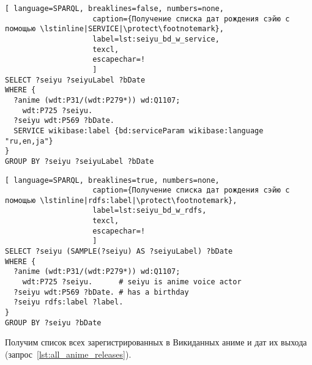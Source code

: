 %
\begin{lstlisting}[ language=SPARQL, breaklines=false, numbers=none,
                    caption={Получение списка дат рождения сэйю с помощью \lstinline|SERVICE|\protect\footnotemark},
                    label=lst:seiyu_bd_w_service,
                    texcl,
                    escapechar=!
                    ]
SELECT ?seiyu ?seiyuLabel ?bDate
WHERE {
  ?anime (wdt:P31/(wdt:P279*)) wd:Q1107;
    wdt:P725 ?seiyu.       
  ?seiyu wdt:P569 ?bDate. 
  SERVICE wikibase:label {bd:serviceParam wikibase:language "ru,en,ja"}
}
GROUP BY ?seiyu ?seiyuLabel ?bDate
\end{lstlisting}%
\begin{lstlisting}[ language=SPARQL, breaklines=true, numbers=none,
                    caption={Получение списка дат рождения сэйю с помощью \lstinline|rdfs:label|\protect\footnotemark},
                    label=lst:seiyu_bd_w_rdfs,
                    texcl,
                    escapechar=!
                    ]
SELECT ?seiyu (SAMPLE(?seiyu) AS ?seiyuLabel) ?bDate
WHERE {
  ?anime (wdt:P31/(wdt:P279*)) wd:Q1107;
    wdt:P725 ?seiyu.      # seiyu is anime voice actor
  ?seiyu wdt:P569 ?bDate. # has a birthday 
  ?seiyu rdfs:label ?label.
}
GROUP BY ?seiyu ?bDate
\end{lstlisting}%








\newpage
Получим список всех зарегистрированных в Викиданных 
аниме и дат их выхода (запрос~\ref{lst:all_anime_releases}).

